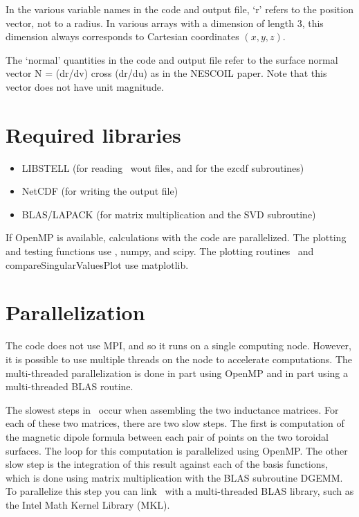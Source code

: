 In the various variable names in the code and output file, `r' refers
to the position vector, not to a radius.  In various arrays with a
dimension of length 3, this dimension always corresponds to Cartesian
coordinates $(x,y,z)$.

The `normal' quantities in the code and output file refer to the
surface normal vector N = (dr/dv) cross (dr/du) as in the NESCOIL
paper. Note that this vector does not have unit magnitude.



\section{Required libraries}

\begin{itemize}

\item {\ttfamily LIBSTELL} (for reading \vmec~{\ttfamily wout} files, and for the {\ttfamily ezcdf} subroutines)
\item {\ttfamily NetCDF} (for writing the output file)
\item {\ttfamily BLAS/LAPACK} (for matrix multiplication and the SVD subroutine)

\end{itemize}

If {\ttfamily OpenMP} is available, calculations with the code are parallelized.  The plotting and testing functions use \python,
{\ttfamily numpy}, and {\ttfamily scipy}.
The plotting routines \bdistribPlot~and {\ttfamily compareSingularValuesPlot} use {\ttfamily matplotlib}.

\section{Parallelization}

The code does not use {\ttfamily MPI}, and so it runs on a single computing node.  However, it is possible to use multiple threads
on the node to accelerate computations.  The multi-threaded parallelization is done in part using {\ttfamily OpenMP}
and in part using a multi-threaded {\ttfamily BLAS} routine.

The slowest steps in \bdistrib~occur when assembling the two
inductance matrices.  For each of these two matrices, there are two slow steps.
The first is computation of the magnetic dipole formula between each pair of points
on the two toroidal surfaces.  The loop for this computation is parallelized using {\ttfamily OpenMP}.
The other slow step is the integration of this result against each of the basis functions,
which is done using matrix multiplication with the {\ttfamily BLAS} subroutine {\ttfamily DGEMM}.
To parallelize this step you can link \bdistrib~with a multi-threaded  {\ttfamily BLAS} library,
such as the Intel Math Kernel Library (MKL).

